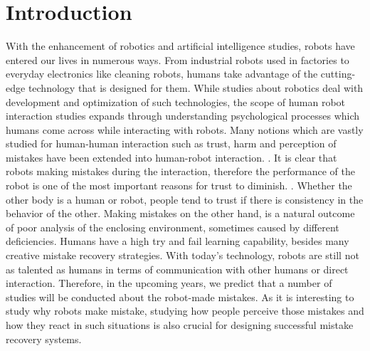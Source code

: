 \documentclass{sigchi}
\begin{document}
\section{Introduction}

With the enhancement of robotics and artificial intelligence studies, robots have entered our lives in numerous ways. From industrial robots used in factories to everyday electronics like cleaning robots, humans take advantage of the cutting-edge technology that is designed for them. While studies about robotics deal with development and optimization of such technologies, the scope of human robot interaction studies expands through understanding psychological processes which humans come across while interacting with robots. Many notions which are vastly studied for human-human interaction such as trust, harm and perception of mistakes have been extended into human-robot interaction. \cite{freedy2007measurement}. It is clear that robots making mistakes during the interaction, therefore the performance of the robot is one of the most important reasons for trust to diminish. \cite{hancock2011meta}. Whether the other body is a human or robot, people tend to trust if there is consistency in the behavior of the other. Making mistakes on the other hand, is a natural outcome of poor analysis of the enclosing environment, sometimes caused by different deficiencies. Humans have a high try and fail learning capability, besides many creative mistake recovery strategies. With today's technology, robots are still not as talented as humans in terms of communication with other humans or direct interaction. Therefore, in the upcoming years, we predict that a number of studies will be conducted about the robot-made mistakes. As it is interesting to study why robots make mistake, studying how people perceive those mistakes and how they react in such situations is also crucial for designing successful mistake recovery systems.
\end{document}

